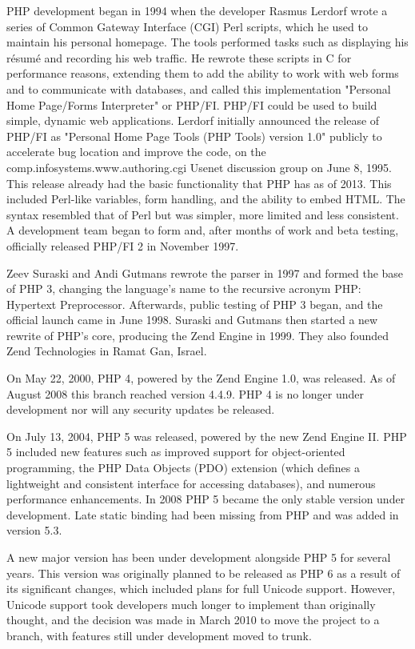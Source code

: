 PHP development began in 1994 when the developer Rasmus Lerdorf wrote a series of Common Gateway Interface (CGI) Perl scripts, which he used to maintain his personal homepage. The tools performed tasks such as displaying his résumé and recording his web traffic. He rewrote these scripts in C for performance reasons, extending them to add the ability to work with web forms and to communicate with databases, and called this implementation "Personal Home Page/Forms Interpreter" or PHP/FI. PHP/FI could be used to build simple, dynamic web applications. Lerdorf initially announced the release of PHP/FI as "Personal Home Page Tools (PHP Tools) version 1.0" publicly to accelerate bug location and improve the code, on the comp.infosystems.www.authoring.cgi Usenet discussion group on June 8, 1995. This release already had the basic functionality that PHP has as of 2013. This included Perl-like variables, form handling, and the ability to embed HTML. The syntax resembled that of Perl but was simpler, more limited and less consistent. A development team began to form and, after months of work and beta testing, officially released PHP/FI 2 in November 1997.


Zeev Suraski and Andi Gutmans rewrote the parser in 1997 and formed the base of PHP 3, changing the language's name to the recursive acronym PHP: Hypertext Preprocessor. Afterwards, public testing of PHP 3 began, and the official launch came in June 1998. Suraski and Gutmans then started a new rewrite of PHP's core, producing the Zend Engine in 1999. They also founded Zend Technologies in Ramat Gan, Israel.

On May 22, 2000, PHP 4, powered by the Zend Engine 1.0, was released. As of August 2008 this branch reached version 4.4.9. PHP 4 is no longer under development nor will any security updates be released.

On July 13, 2004, PHP 5 was released, powered by the new Zend Engine II. PHP 5 included new features such as improved support for object-oriented programming, the PHP Data Objects (PDO) extension (which defines a lightweight and consistent interface for accessing databases), and numerous performance enhancements. In 2008 PHP 5 became the only stable version under development. Late static binding had been missing from PHP and was added in version 5.3.


A new major version has been under development alongside PHP 5 for several years. This version was originally planned to be released as PHP 6 as a result of its significant changes, which included plans for full Unicode support. However, Unicode support took developers much longer to implement than originally thought, and the decision was made in March 2010 to move the project to a branch, with features still under development moved to trunk.

